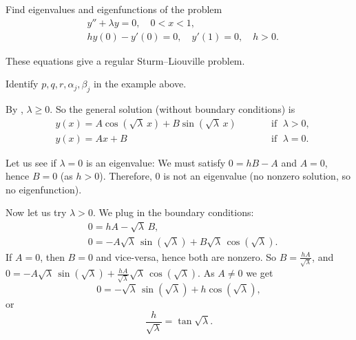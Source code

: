 \begin{example}
Find eigenvalues and eigenfunctions of the problem
\begin{align*}
& y''+\lambda y = 0, \quad 0 < x < 1 , \\
& hy(0)- y'(0) = 0, \quad y'(1)  = 0, \quad h > 0.
\end{align*}

These equations give a regular Sturm--Liouville problem.

\begin{exercise}
Identify $p, q, r, \alpha_j, \beta_j$ in the example above.
\end{exercise}

By ,
$\lambda \geq 0$.
So the general solution (without boundary conditions) is
\begin{equation*}
\begin{aligned}
 & y(x) = A \cos ( \sqrt{\lambda}\, x) + B \sin (
\sqrt{\lambda}\, x) & & \qquad \text{if } \; \lambda > 0 , \\
& y(x) = A x + B & & \qquad \text{if } \; \lambda = 0 .
\end{aligned}
\end{equation*}

Let us see if $\lambda = 0$ is an eigenvalue:
We must satisfy $0 = hB - A$ and $A = 0$, hence $B=0$ (as $h > 0$).
Therefore, 0 is not an eigenvalue (no nonzero solution, so no eigenfunction).

Now let us
try $\lambda > 0$.  We plug in the boundary conditions:
\begin{align*}
& 0 = h A - \sqrt{\lambda}\, B , \\
& 0 = -A \sqrt{\lambda}\, \sin (\sqrt{\lambda}) +B \sqrt{\lambda}\,
\cos (\sqrt{\lambda}) .
\end{align*}
If $A=0$, then $B=0$ and vice-versa, hence both are nonzero.
So $B = \frac{hA}{\sqrt{\lambda}}$, and
$0 = -A \sqrt{\lambda}\, \sin ( \sqrt{\lambda}) + \frac{hA}{\sqrt{\lambda}}
\sqrt{\lambda}\, \cos ( \sqrt{\lambda})$.  As $A \not= 0$ we get
\begin{equation*}
0 = 
- \sqrt{\lambda}\, \sin ( \sqrt{\lambda}) + h \cos ( \sqrt{\lambda}) ,
\end{equation*}
or
\begin{equation*}
\frac{h}{\sqrt{\lambda}} = \tan \sqrt{\lambda} .
\end{equation*}


\end{example}
